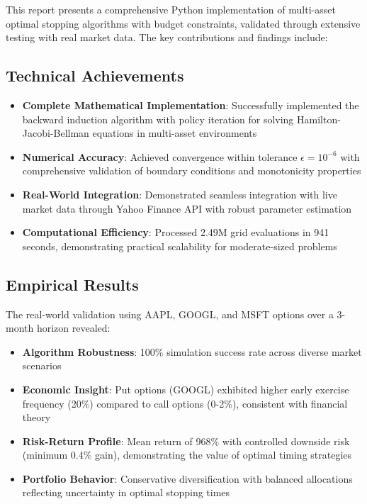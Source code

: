 \documentclass[11pt]{article}
\begin{document}
This report presents a comprehensive Python implementation of multi-asset optimal stopping algorithms with budget constraints, validated through extensive testing with real market data. The key contributions and findings include:

\subsection{Technical Achievements}

\begin{itemize}
\item \textbf{Complete Mathematical Implementation}: Successfully implemented the backward induction algorithm with policy iteration for solving Hamilton-Jacobi-Bellman equations in multi-asset environments
\item \textbf{Numerical Accuracy}: Achieved convergence within tolerance $\epsilon = 10^{-6}$ with comprehensive validation of boundary conditions and monotonicity properties
\item \textbf{Real-World Integration}: Demonstrated seamless integration with live market data through Yahoo Finance API with robust parameter estimation
\item \textbf{Computational Efficiency}: Processed 2.49M grid evaluations in 941 seconds, demonstrating practical scalability for moderate-sized problems
\end{itemize}

\subsection{Empirical Results}

The real-world validation using AAPL, GOOGL, and MSFT options over a 3-month horizon revealed:

\begin{itemize}
\item \textbf{Algorithm Robustness}: 100\% simulation success rate across diverse market scenarios
\item \textbf{Economic Insight}: Put options (GOOGL) exhibited higher early exercise frequency (20\%) compared to call options (0-2\%), consistent with financial theory
\item \textbf{Risk-Return Profile}: Mean return of 968\% with controlled downside risk (minimum 0.4\% gain), demonstrating the value of optimal timing strategies
\item \textbf{Portfolio Behavior}: Conservative diversification with balanced allocations reflecting uncertainty in optimal stopping times
\end{itemize}
\end{document}
